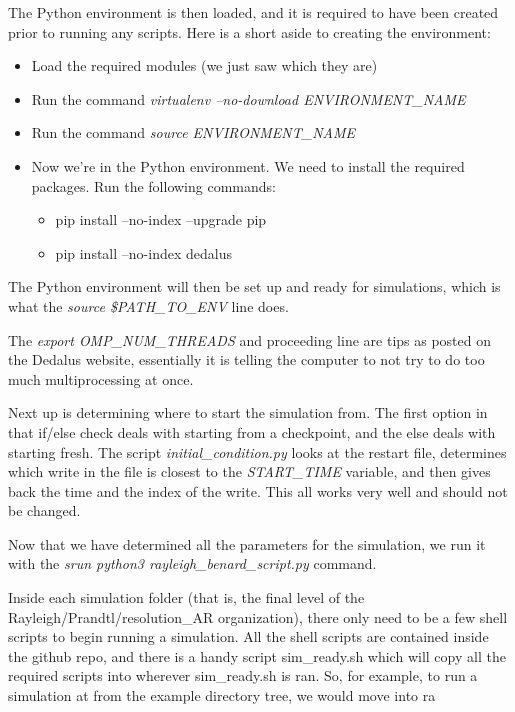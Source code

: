 \documentclass[12pt,a4paper]{report}
\begin{document}
	The Python environment is then loaded, and it is required to have been created prior to running any scripts. Here is a short aside to creating the environment:

	\begin{itemize}
		\item Load the required modules (we just saw which they are)
		\item Run the command \textit{virtualenv --no-download ENVIRONMENT\_NAME}
		\item Run the command \textit{source ENVIRONMENT\_NAME}
		\item Now we're in the Python environment. We need to install the required packages. Run the following commands:
		\begin{itemize}
			\item pip install --no-index --upgrade pip
			\item pip install --no-index dedalus
		\end{itemize}
	\end{itemize}

	The Python environment will then be set up and ready for simulations, which is what the \textit{source \$PATH\_TO\_ENV} line does.

	The \textit{export OMP\_NUM\_THREADS} and proceeding line are tips as posted on the Dedalus website, essentially it is telling the computer to not try to do too much multiprocessing at once.

	Next up is determining where to start the simulation from. The first option in that if/else check deals with starting from a checkpoint, and the else deals with starting fresh. The script \textit{initial\_condition.py} looks at the restart file, determines which write in the file is closest to the \textit{START\_TIME} variable, and then gives back the time and the index of the write. This all works very well and should not be changed.

	Now that we have determined all the parameters for the simulation, we run it with the \textit{srun python3 rayleigh\_benard\_script.py} command.

	Inside each simulation folder (that is, the final level of the Rayleigh/Prandtl/resolution\_AR organization), there only need to be a few shell scripts to begin running a simulation. All the shell scripts are contained inside the github repo, and there is a handy script sim\_ready.sh which will copy all the required scripts into wherever sim\_ready.sh is ran. So, for example, to run a simulation at from the example directory tree, we would move into  ra
\end{document}
